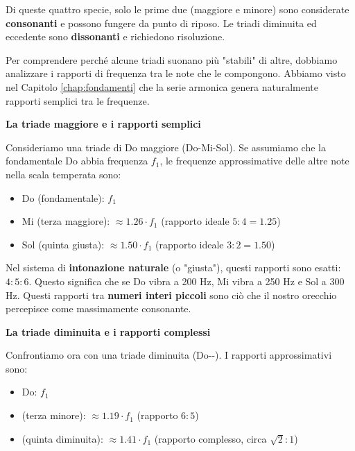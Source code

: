 Di queste quattro specie, solo le prime due (maggiore e minore) sono considerate \textbf{consonanti} e possono fungere da punto di riposo. Le triadi diminuita ed eccedente sono \textbf{dissonanti} e richiedono risoluzione.

\begin{esempio}
	\label{ex:quattro_triadi}
\end{esempio}

\begin{fisica}
	\label{phys:rapporti_frequenza_triadi}
	
	Per comprendere perché alcune triadi suonano più "stabili" di altre, dobbiamo analizzare i rapporti di frequenza tra le note che le compongono. Abbiamo visto nel Capitolo \ref{chap:fondamenti} che la serie armonica genera naturalmente rapporti semplici tra le frequenze.
	
	\textbf{La triade maggiore e i rapporti semplici}
	
	Consideriamo una triade di Do maggiore (Do-Mi-Sol). Se assumiamo che la fondamentale Do abbia frequenza $f_1$, le frequenze approssimative delle altre note nella scala temperata sono:
	\begin{itemize}
		\item Do (fondamentale): $f_1$
		\item Mi (terza maggiore): $\approx 1.26 \cdot f_1$ (rapporto ideale $5:4 = 1.25$)
		\item Sol (quinta giusta): $\approx 1.50 \cdot f_1$ (rapporto ideale $3:2 = 1.50$)
	\end{itemize}
	
	Nel sistema di \textbf{intonazione naturale} (o "giusta"), questi rapporti sono esatti: $4:5:6$. Questo significa che se Do vibra a 200 Hz, Mi vibra a 250 Hz e Sol a 300 Hz. Questi rapporti tra \textbf{numeri interi piccoli} sono ciò che il nostro orecchio percepisce come massimamente consonante.
	
	\textbf{La triade diminuita e i rapporti complessi}
	
	Confrontiamo ora con una triade diminuita (Do-\Mibemolle -\Solbemolle ). I rapporti approssimativi sono:
	\begin{itemize}
		\item Do: $f_1$
		\item \Mibemolle  (terza minore): $\approx 1.19 \cdot f_1$ (rapporto $6:5$)
		\item \Solbemolle  (quinta diminuita): $\approx 1.41 \cdot f_1$ (rapporto complesso, circa $\sqrt{2}:1$)
	\end{itemize}
	

\end{fisica}
